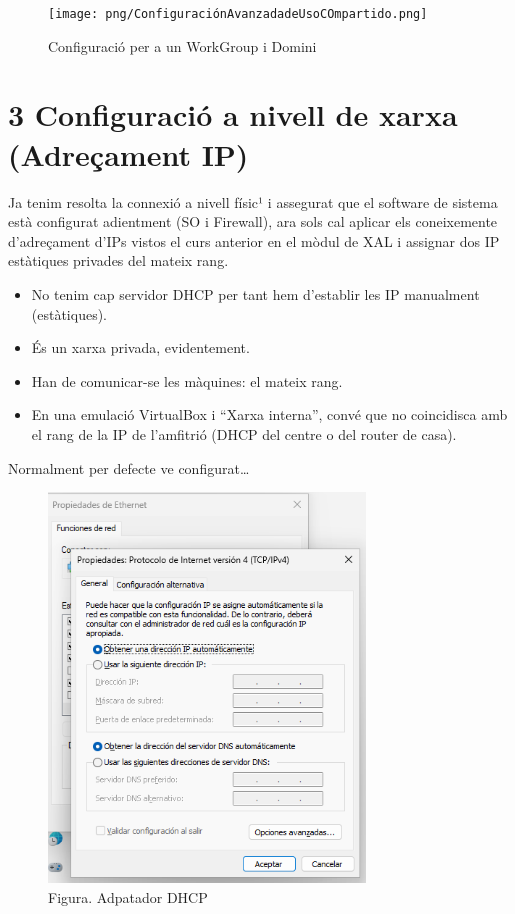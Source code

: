 \documentclass[
  a4paper,
]{article}
\providecommand{\tightlist}{%
  \setlength{\itemsep}{0pt}\setlength{\parskip}{0pt}}
\begin{document}
\begin{figure}
\centering
\texttt{[image: png/ConfiguraciónAvanzadadeUsoCOmpartido.png]}
\caption{Configuració per a un WorkGroup i Domini}
\end{figure}

\section{3 Configuració a nivell de xarxa (Adreçament
IP)}\label{configuraciuxf3-a-nivell-de-xarxa-adreuxe7ament-ip}

Ja tenim resolta la connexió a nivell físic¹ i assegurat que el software
de sistema està configurat adientment (SO i Firewall), ara sols cal
aplicar els coneixemente d'adreçament d'IPs vistos el curs anterior en
el mòdul de XAL i assignar dos IP estàtiques privades del mateix rang.

\begin{itemize}
\tightlist
\item
  No tenim cap servidor DHCP per tant hem d'establir les IP manualment
  (estàtiques).
\item
  És un xarxa privada, evidentement.
\item
  Han de comunicar-se les màquines: el mateix rang.
\item
  En una emulació VirtualBox i ``Xarxa interna'', convé que no
  coincidisca amb el rang de la IP de l'amfitrió (DHCP del centre o del
  router de casa).
\end{itemize}

Normalment per defecte ve configurat\ldots{}

\begin{figure}
\centering
\includegraphics[width=0.75\textwidth,height=\textheight]{png/adaptador.png}
\caption{Figura. Adpatador DHCP}
\end{figure}
\end{document}

